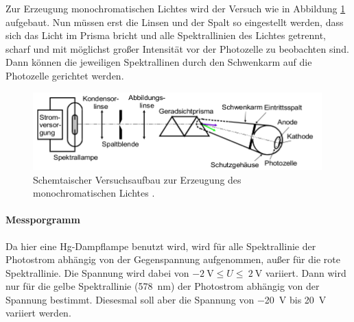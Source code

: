 Zur Erzeugung monochromatischen Lichtes wird der Versuch wie in Abbildung
\ref{fig:VAO} aufgebaut. Nun müssen erst die Linsen und der Spalt so eingestellt
werden, dass sich das Licht im Prisma bricht und alle Spektrallinien des Lichtes
getrennt, scharf und mit möglichst großer Intensität vor der Photozelle zu beobachten
sind. Dann können die jeweiligen Spektrallinen durch den Schwenkarm auf die
Photozelle gerichtet werden.

\begin{figure}
  \centering
  \includegraphics[height=3cm]{logos/VAOptisch.png}
  \caption{Schemtaischer Versuchsaufbau zur Erzeugung des monochromatischen Lichtes \cite{Anleitung}.}
  \label{fig:VAO}
\end{figure}

\paragraph{Messporgramm}
Da hier eine Hg-Dampflampe benutzt wird, wird für alle Spektrallinie der
Photostrom abhängig von der Gegenspannung aufgenommen, außer für die rote Spektrallinie.
Die Spannung wird dabei von $ \SI{-2}{\volt} \leq U \leq \ \SI{2}{\volt}$ variiert.
Dann wird nur für die gelbe Spektrallinie (\SI{578}{\nano\meter}) der Photostrom
abhängig von der Spannung bestimmt. Diesesmal soll aber die Spannung von
\SI{-20}{\volt} bis \SI{20}{\volt} variiert werden.
